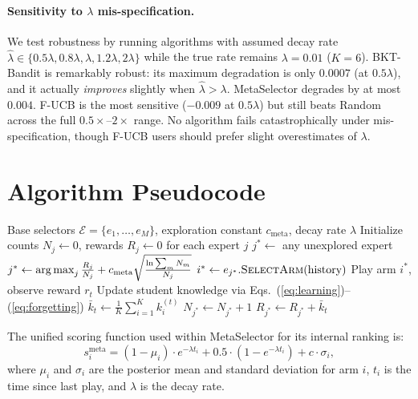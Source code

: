 \paragraph{Sensitivity to $\lambda$ mis-specification.}
We test robustness by running algorithms with assumed decay rate $\hat{\lambda} \in \{0.5\lambda, 0.8\lambda, \lambda, 1.2\lambda, 2\lambda\}$ while the true rate remains $\lambda{=}0.01$ ($K{=}6$). BKT-Bandit is remarkably robust: its maximum degradation is only $0.0007$ (at $0.5\lambda$), and it actually \emph{improves} slightly when $\hat{\lambda} > \lambda$. MetaSelector degrades by at most $0.004$. F-UCB is the most sensitive ($-0.009$ at $0.5\lambda$) but still beats Random across the full $0.5\times$--$2\times$ range. No algorithm fails catastrophically under mis-specification, though F-UCB users should prefer slight overestimates of $\lambda$.

\section{Algorithm Pseudocode}
\label{app:pseudocode}

\begin{algorithm}[h]
\caption{MetaSelector: UCB over Expert Selectors}
\label{alg:meta}
\begin{algorithmic}[1]
\REQUIRE Base selectors $\mathcal{E} = \{e_1, \ldots, e_M\}$, exploration constant $c_{\mathrm{meta}}$, decay rate $\lambda$
\STATE Initialize counts $N_j \leftarrow 0$, rewards $R_j \leftarrow 0$ for each expert $j$
        \STATE $j^* \leftarrow$ any unexplored expert 
    \ELSE
        \STATE $j^* \leftarrow \operatorname*{arg\,max}_j \frac{R_j}{N_j} + c_{\mathrm{meta}} \sqrt{\frac{\ln \sum_m N_m}{N_j}}$ 
    \ENDIF
    \STATE $i^* \leftarrow e_{j^*}.\textsc{SelectArm}(\text{history})$ 
    \STATE Play arm $i^*$, observe reward $r_t$
    \STATE Update student knowledge via Eqs.~(\ref{eq:learning})--(\ref{eq:forgetting})
    \STATE $\bar{k}_t \leftarrow \frac{1}{K}\sum_{i=1}^{K} k_i^{(t)}$ 
    \STATE $N_{j^*} \leftarrow N_{j^*} + 1$
    \STATE $R_{j^*} \leftarrow R_{j^*} + \bar{k}_t$ 
\ENDFOR
\end{algorithmic}
\end{algorithm}

The unified scoring function used within MetaSelector for its internal ranking is:
\begin{equation}
    s_i^{\text{meta}} = (1 - \mu_i) \cdot e^{-\lambda t_i} + 0.5 \cdot (1 - e^{-\lambda t_i}) + c \cdot \sigma_i,
    \tag{S1}
\end{equation}
where $\mu_i$ and $\sigma_i$ are the posterior mean and standard deviation for arm $i$, $t_i$ is the time since last play, and $\lambda$ is the decay rate.

